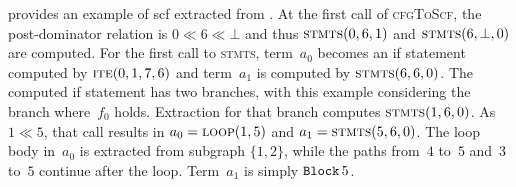 \begin{example}
   provides an example of \ac{scf} extracted from .
  At the first call of \textsc{cfgToScf},
  the post-dominator relation is $0\ll 6\ll\bot$%
  and thus $\textsc{stmts}(0,6,1)$ and $\textsc{stmts}(6,\bot,0)$ are computed.
  For the first call to \textsc{stmts},
  term~$a_0$ becomes an if statement computed by $\textsc{ite}(0,1,7,6)$
  and term~$a_1$ is computed by $\textsc{stmts}(6,6,0)$.
  The computed if statement has two branches,
  with this example considering the branch where~$f_0$ holds.
  Extraction for that branch computes $\textsc{stmts}(1,6,0)$.
  As $1\ll 5$, that call results in $a_0=\textsc{loop}(1,5)$
  and $a_1=\textsc{stmts}(5,6,0)$.
  The loop body in~$a_0$ is extracted from subgraph $\{1,2\}$,%
  while the paths from~$4$ to~$5$ and~$3$ to~$5$ continue after the loop.
  Term~$a_1$ is simply $\operatorname{\mathtt{Block}} 5$.
\end{example}


